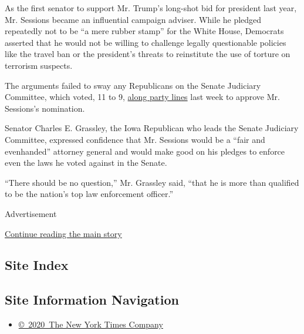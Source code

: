 As the first senator to support Mr. Trump's long-shot bid for president
last year, Mr. Sessions became an influential campaign adviser. While he
pledged repeatedly not to be ``a mere rubber stamp'' for the White
House, Democrats asserted that he would not be willing to challenge
legally questionable policies like the travel ban or the president's
threats to reinstitute the use of torture on terrorism suspects.

The arguments failed to sway any Republicans on the Senate Judiciary
Committee, which voted, 11 to 9,
\href{https://www.nytimes.com/2017/02/01/us/politics/jeff-sessions-approved-as-attorney-general-by-senate-committee.html}{along
party lines} last week to approve Mr. Sessions's nomination.

Senator Charles E. Grassley, the Iowa Republican who leads the Senate
Judiciary Committee, expressed confidence that Mr. Sessions would be a
``fair and evenhanded'' attorney general and would make good on his
pledges to enforce even the laws he voted against in the Senate.

``There should be no question,'' Mr. Grassley said, ``that he is more
than qualified to be the nation's top law enforcement officer.''

Advertisement

\protect\hyperlink{after-bottom}{Continue reading the main story}

\hypertarget{site-index}{%
\subsection{Site Index}\label{site-index}}

\hypertarget{site-information-navigation}{%
\subsection{Site Information
Navigation}\label{site-information-navigation}}

\begin{itemize}
\tightlist
\item
  \href{https://help.nytimes.com/hc/en-us/articles/115014792127-Copyright-notice}{©~2020~The
  New York Times Company}
\end{itemize}

